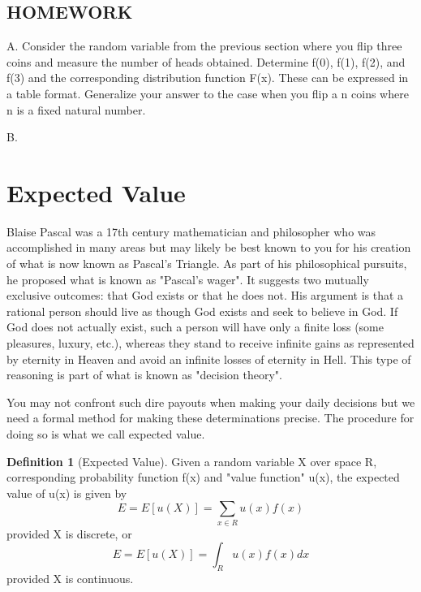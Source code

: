 \documentclass[10pt,]{book}
\theoremstyle{plain}
\theoremstyle{definition}
\newtheorem{definition}[theorem]{Definition}
\theoremstyle{definition}
\theoremstyle{definition}
\numberwithin{equation}{section}
\begin{document}
\subsection[{HOMEWORK}]{HOMEWORK}\label{subsection-3}

	A.  Consider the random variable from the previous section where you flip three coins and measure the number of heads obtained. Determine f(0), f(1), f(2), and f(3) and the corresponding distribution function F(x). These can be expressed in a table format. Generalize your answer to the case when you flip a n coins where n is a fixed natural number.
\par

	B.  
\typeout{************************************************}
\typeout{************************************************}
\section[{Expected Value}]{Expected Value}\label{section-27}
Blaise Pascal was a 	17th century mathematician and philosopher who was accomplished in many areas but may likely be best known to you for his creation of what is now known as Pascal's Triangle. As part of his philosophical pursuits, he proposed what is known as "Pascal's wager". It suggests two  mutually exclusive outcomes: that God exists or that he does not. His argument is that a rational person should live as though God exists and seek to believe in God. If God does not actually exist, such a person will have only a finite loss (some pleasures, luxury, etc.), whereas they stand to receive infinite gains as represented by eternity in Heaven and avoid an infinite losses of eternity in Hell. This type of reasoning is part of what is known as "decision theory".
\par
You may not confront such dire payouts when making your daily decisions but we need a formal method for making these determinations precise. The procedure for doing so is what we call expected value.
\begin{definition}[{Expected Value}]\label{definition-26}
Given a random variable X over space R, corresponding probability function f(x) and "value function" u(x), the expected value of u(x) is given by
	\begin{equation*}E = E[u(X)] = \sum_{x \in R} u(x) f(x)\end{equation*}
	provided X is discrete, or
	\begin{equation*}E = E[u(X)] = \int_R u(x)f(x) dx\end{equation*}
	provided X is continuous.
\end{definition}
\end{document}

